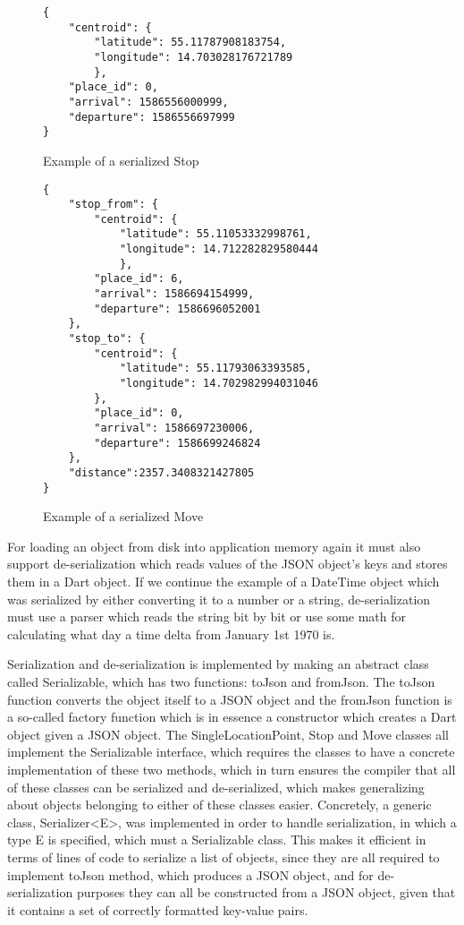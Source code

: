 \begin{figure}
    \centering
\begin{verbatim}
{
    "centroid": {
        "latitude": 55.11787908183754,
        "longitude": 14.703028176721789
        },
    "place_id": 0,
    "arrival": 1586556000999,
    "departure": 1586556697999
}
\end{verbatim}
    \caption{Example of a serialized Stop}
    \label{fig:serialized_stop}
\end{figure}

\begin{figure}
    \centering
\begin{verbatim}
{
    "stop_from": {
        "centroid": {
            "latitude": 55.11053332998761,
            "longitude": 14.712282829580444
            },
        "place_id": 6,
        "arrival": 1586694154999,
        "departure": 1586696052001
    },
    "stop_to": {
        "centroid": {
            "latitude": 55.11793063393585,
            "longitude": 14.702982994031046
        },
        "place_id": 0,
        "arrival": 1586697230006,
        "departure": 1586699246824
    },
    "distance":2357.3408321427805
}
\end{verbatim}
    \caption{Example of a serialized Move}
    \label{fig:serialized_move}
\end{figure}


For loading an object from disk into application memory again it must also support de-serialization which reads values of the JSON object's keys and stores them in a Dart object. If we continue the example of a DateTime object which was serialized by either converting it to a number or a string, de-serialization must use a parser which reads the string bit by bit or use some math for calculating what day a time delta from January 1st 1970 is. 

Serialization and de-serialization is implemented by making an abstract class called Serializable, which has two functions: toJson and fromJson. The toJson function converts the object itself to a JSON object and the fromJson function is a so-called factory function which is in essence a constructor which creates a Dart object given a JSON object. The SingleLocationPoint, Stop and Move classes all implement the Serializable interface, which requires the classes to have a concrete implementation of these two methods, which in turn ensures the compiler that all of these classes can be serialized and de-serialized, which makes generalizing about objects belonging to either of these classes easier. Concretely, a generic class, Serializer<E>, was implemented in order to handle serialization, in which a type E is specified, which must a Serializable class. This makes it efficient in terms of lines of code to serialize a list of objects, since they are all required to implement toJson method, which produces a JSON object, and for de-serialization purposes they can all be constructed from a JSON object, given that it contains a set of correctly formatted key-value pairs.

